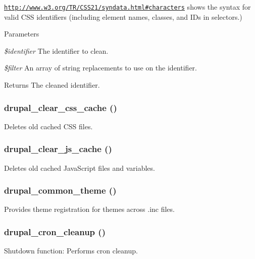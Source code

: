 \href{http://www.w3.org/TR/CSS21/syndata.html#characters}{\tt http://www.w3.org/TR/CSS21/syndata.html\#characters} shows the syntax for valid CSS identifiers (including element names, classes, and IDs in selectors.)


\begin{DoxyParams}{Parameters}
\item[{\em \$identifier}]The identifier to clean. \item[{\em \$filter}]An array of string replacements to use on the identifier.\end{DoxyParams}
\begin{DoxyReturn}{Returns}
The cleaned identifier. 
\end{DoxyReturn}
\hypertarget{common_8inc_ae89dbd2b41a6623be2ed704d039a5c7c}{
\subsubsection[{drupal\_\-clear\_\-css\_\-cache}]{\setlength{\rightskip}{0pt plus 5cm}drupal\_\-clear\_\-css\_\-cache ()}}
\label{common_8inc_ae89dbd2b41a6623be2ed704d039a5c7c}
Deletes old cached CSS files. \hypertarget{common_8inc_ac05e083cb7cb02084601f8d2103b0405}{
\subsubsection[{drupal\_\-clear\_\-js\_\-cache}]{\setlength{\rightskip}{0pt plus 5cm}drupal\_\-clear\_\-js\_\-cache ()}}
\label{common_8inc_ac05e083cb7cb02084601f8d2103b0405}
Deletes old cached JavaScript files and variables. \hypertarget{common_8inc_a1263ef82e0da5b85f8203783ed164872}{
\subsubsection[{drupal\_\-common\_\-theme}]{\setlength{\rightskip}{0pt plus 5cm}drupal\_\-common\_\-theme ()}}
\label{common_8inc_a1263ef82e0da5b85f8203783ed164872}
Provides theme registration for themes across .inc files. \hypertarget{common_8inc_a9067aaeb503fb9f994d98728130390a2}{
\subsubsection[{drupal\_\-cron\_\-cleanup}]{\setlength{\rightskip}{0pt plus 5cm}drupal\_\-cron\_\-cleanup ()}}
\label{common_8inc_a9067aaeb503fb9f994d98728130390a2}
Shutdown function: Performs cron cleanup.

